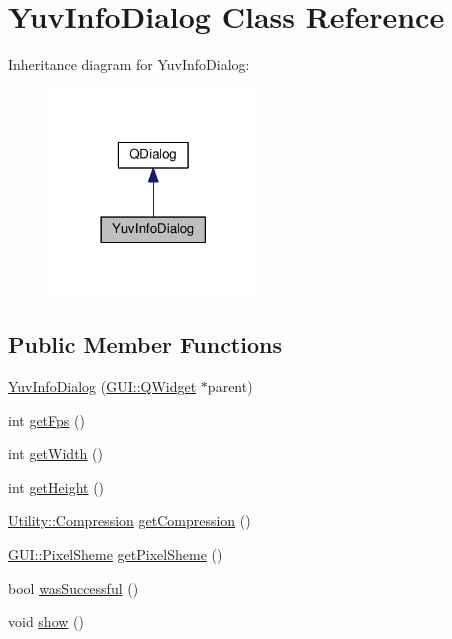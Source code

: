 \hypertarget{classGUI_1_1YuvInfoDialog}{}\section{Yuv\+Info\+Dialog Class Reference}
\label{classGUI_1_1YuvInfoDialog}


Inheritance diagram for Yuv\+Info\+Dialog\+:
\nopagebreak
\begin{figure}[H]
\begin{center}
\leavevmode
\includegraphics[width=158pt]{classGUI_1_1YuvInfoDialog__inherit__graph}
\end{center}
\end{figure}
\subsection*{Public Member Functions}
\begin{DoxyCompactItemize}
\item 
\hyperlink{classGUI_1_1YuvInfoDialog_a0c5446ed8ab005637f6b79bf5ccfc920}{Yuv\+Info\+Dialog} (\hyperlink{classGUI_1_1QWidget}{G\+U\+I\+::\+Q\+Widget} $\ast$parent)
\item 
int \hyperlink{classGUI_1_1YuvInfoDialog_a519ad5c0664b9de28c1a6d9dc77f959d}{get\+Fps} ()
\item 
int \hyperlink{classGUI_1_1YuvInfoDialog_a67a0997183f24da19b776d96c1052998}{get\+Width} ()
\item 
int \hyperlink{classGUI_1_1YuvInfoDialog_a07efb2a4e9a982688c8bb3c3f21d1092}{get\+Height} ()
\item 
\hyperlink{namespaceUtility_a56a83bf6847f4801f4205eb4be237ccf}{Utility\+::\+Compression} \hyperlink{classGUI_1_1YuvInfoDialog_a000ce702632feab3b3c87d4416f0b3d3}{get\+Compression} ()
\item 
\hyperlink{namespaceGUI_a52432774abcaf0c8c417ae77739fccfc}{G\+U\+I\+::\+Pixel\+Sheme} \hyperlink{classGUI_1_1YuvInfoDialog_a30c56f1f9dca274af19da20bc5471ce7}{get\+Pixel\+Sheme} ()
\item 
bool \hyperlink{classGUI_1_1YuvInfoDialog_a6677ab283cdae9435a6be93d9c3481b2}{was\+Successful} ()
\item 
void \hyperlink{classGUI_1_1YuvInfoDialog_a4b148f40a95444d5669406b918ad2f52}{show} ()
\end{DoxyCompactItemize}
